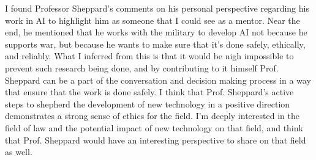 \documentclass{article}
\begin{document}
\par I found Professor Sheppard’s comments on his personal perspective regarding his work in AI to highlight him as someone that I could see as a mentor. Near the end, he mentioned that he works with the military to develop AI not because he supports war, but because he wants to make sure that it’s done safely, ethically, and reliably. What I inferred from this is that it would be nigh impossible to prevent such research being done, and by contributing to it himself Prof. Sheppard can be a part of the conversation and decision making process in a way that ensure that the work is done safely. I think that Prof. Sheppard’s active steps to shepherd the development of new technology in a positive direction demonstrates a strong sense of ethics for the field. I’m deeply interested in the field of law and the potential impact of new technology on that field, and think that Prof. Sheppard would have an interesting perspective to share on that field as well.

\end{document}
